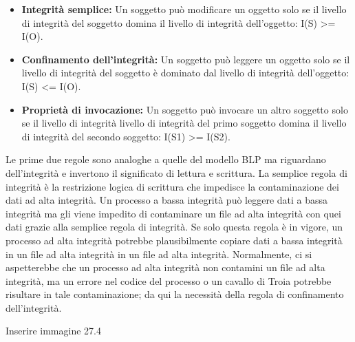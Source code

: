 \begin{itemize}
    \item \textbf{Integrità semplice:} Un soggetto può modificare un oggetto solo se il livello di integrità del soggetto domina il livello di integrità dell'oggetto: I(S) >= I(O).
    
    \item \textbf{Confinamento dell'integrità:} Un soggetto può leggere un oggetto solo se il livello di integrità del soggetto è dominato dal livello di integrità dell'oggetto: I(S) <= I(O).
    
    \item \textbf{Proprietà di invocazione:} Un soggetto può invocare un altro soggetto solo se il livello di integrità livello di integrità del primo soggetto domina il livello di integrità del secondo soggetto: I(S1) >= I(S2).

\end{itemize}
Le prime due regole sono analoghe a quelle del modello BLP ma riguardano dell'integrità e invertono il significato di lettura e scrittura. La semplice regola di integrità è la restrizione logica di scrittura che impedisce la contaminazione dei dati ad alta integrità.
Un processo a bassa integrità può leggere dati a bassa integrità ma gli viene impedito di contaminare un file ad alta integrità con quei dati grazie alla semplice regola di integrità. Se solo questa regola è in vigore, un processo ad alta integrità potrebbe plausibilmente copiare dati a bassa integrità in un file ad alta integrità in un file ad alta integrità. Normalmente, ci si aspetterebbe che un processo ad alta integrità non contamini un file ad alta integrità, ma un errore nel codice del processo o un cavallo di Troia potrebbe risultare in tale contaminazione; da qui la necessità della regola di confinamento dell'integrità.

Inserire immagine 27.4

